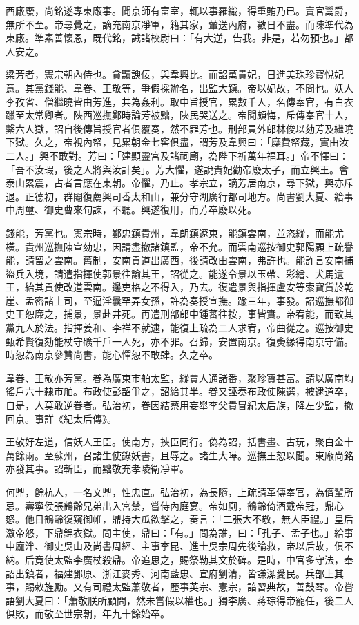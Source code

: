 \begin{pinyinscope}
西廠廢，尚銘遂專東廠事。聞京師有富室，輒以事羅織，得重賄乃已。賣官鬻爵，無所不至。帝尋覺之，謫充南京凈軍，籍其家，輦送內府，數日不盡。而陳準代為東廠。準素善懷恩，既代銘，誡諸校尉曰：「有大逆，告我。非是，若勿預也。」都人安之。

梁芳者，憲宗朝內侍也。貪黷諛佞，與韋興比。而諂萬貴妃，日進美珠珍寶悅妃意。其黨錢能、韋眷、王敬等，爭假採辦名，出監大鎮。帝以妃故，不問也。妖人李孜省、僧繼曉皆由芳進，共為姦利。取中旨授官，累數千人，名傳奉官，有白衣躐至太常卿者。陜西巡撫鄭時論芳被黜，陜民哭送之。帝聞頗悔，斥傳奉官十人，繫六人獄，詔自後傳旨授官者俱覆奏，然不罪芳也。刑部員外郎林俊以劾芳及繼曉下獄。久之，帝視內帑，見累朝金七窖俱盡，謂芳及韋興曰：「糜費帑藏，實由汝二人。」興不敢對。芳曰：「建顯靈宮及諸祠廟，為陛下祈萬年福耳。」帝不懌曰：「吾不汝瑕，後之人將與汝計矣」。芳大懼，遂說貴妃勸帝廢太子，而立興王。會泰山累震，占者言應在東朝。帝懼，乃止。孝宗立，謫芳居南京，尋下獄，興亦斥退。正德初，群閹復薦興司香太和山，兼分守湖廣行都司地方。尚書劉大夏、給事中周璽、御史曹來旬諫，不聽。興遂復用，而芳卒廢以死。

錢能，芳黨也。憲宗時，鄭忠鎮貴州，韋朗鎮遼東，能鎮雲南，並恣縱，而能尤橫。貴州巡撫陳宣劾忠，因請盡撤諸鎮監，帝不允。而雲南巡按御史郭陽顧上疏譽能，請留之雲南。舊制，安南貢道出廣西，後請改由雲南，弗許也。能詐言安南捕盜兵入境，請遣指揮使郭景往諭其王，詔從之。能遂令景以玉帶、彩繒、犬馬遺王，紿其貢使改道雲南。邊吏格之不得入，乃去。復遣景與指揮盧安等索寶貨於乾崖、孟密諸土司，至逼淫曩罕弄女孫，許為奏授宣撫。踰三年，事發。詔巡撫都御史王恕廉之，捕景，景赴井死。再遣刑部郎中鍾蕃往按，事皆實。帝宥能，而致其黨九人於法。指揮姜和、李祥不就逮，能復上疏為二人求宥，帝曲從之。巡按御史甄希賢復劾能杖守礦千戶一人死，亦不罪。召歸，安置南京。復夤緣得南京守備。時恕為南京參贊尚書，能心憚恕不敢肆。久之卒。

韋眷、王敬亦芳黨。眷為廣東市舶太監，縱賈人通諸番，聚珍寶甚富。請以廣南均徭戶六十隸市舶。布政使彭韶爭之，詔給其半。眷又誣奏布政使陳選，被逮道卒，自是，人莫敢逆眷者。弘治初，眷因結蔡用妄舉李父貴冒紀太后族，降左少監，撤回京。事詳《紀太后傳》。

王敬好左道，信妖人王臣。使南方，挾臣同行。偽為詔，括書畫、古玩，聚白金十萬餘兩。至蘇州，召諸生使錄妖書，且辱之。諸生大嘩。巡撫王恕以聞。東廠尚銘亦發其事。詔斬臣，而黜敬充孝陵衛凈軍。

何鼎，餘杭人，一名文鼎，性忠直。弘治初，為長隨，上疏請革傳奉官，為儕輩所忌。壽寧侯張鶴齡兄弟出入宮禁，嘗侍內庭宴。帝如廁，鶴齡倚酒戴帝冠，鼎心怒。他日鶴齡復窺御帷，鼎持大瓜欲擊之，奏言：「二張大不敬，無人臣禮。」皇后激帝怒，下鼎錦衣獄。問主使，鼎曰：「有。」問為誰，曰：「孔子、孟子也。」給事中龐泮、御史吳山及尚書周經、主事李昆、進士吳宗周先後論救，帝以后故，俱不納。后竟使太監李廣杖殺鼎。帝追思之，賜祭勒其文於碑。是時，中官多守法，奉詔出鎮者，福建鄧原、浙江麥秀、河南藍忠、宣府劉清，皆謙潔愛民。兵部上其事，賜敕旌勵。又有司禮太監蕭敬者，歷事英宗、憲宗，諳習典故，善鼓琴。帝嘗語劉大夏曰：「蕭敬朕所顧問，然未嘗假以權也。」獨李廣、蔣琮得帝寵任，後二人俱敗，而敬至世宗朝，年九十餘始卒。


\end{pinyinscope}
